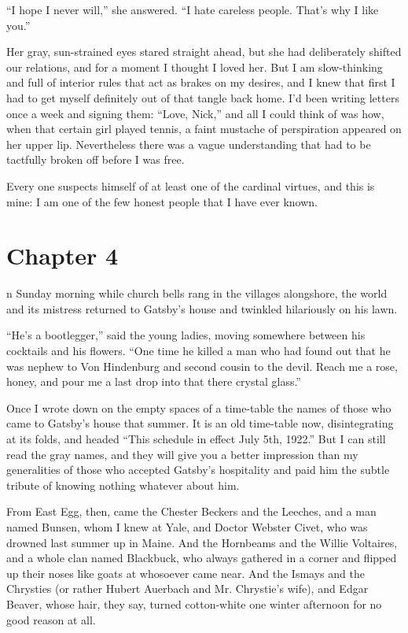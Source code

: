 \documentclass{znotebook}
\begin{document}
``I hope I never will,'' she answered. ``I hate careless people. That's why I like you.''

Her gray, sun-strained eyes stared straight ahead, but she had deliberately shifted our relations, and for a moment I thought I loved her. But I am slow-thinking and full of interior rules that act as brakes on my desires, and I knew that first I had to get myself definitely out of that tangle back home. I'd been writing letters once a week and signing them: ``Love, Nick,'' and all I could think of was how, when that certain girl played tennis, a faint mustache of perspiration appeared on her upper lip. Nevertheless there was a vague understanding that had to be tactfully broken off before I was free.

Every one suspects himself of at least one of the cardinal virtues, and this is mine: I am one of the few honest people that I have ever known.

\chapter{Chapter 4}

\lettrine[findent=2pt]{}{ }n Sunday morning while church bells rang in the villages alongshore, the world and its mistress returned to Gatsby's house and twinkled hilariously on his lawn.

``He's a bootlegger,'' said the young ladies, moving somewhere between his cocktails and his flowers. ``One time he killed a man who had found out that he was nephew to Von Hindenburg and second cousin to the devil. Reach me a rose, honey, and pour me a last drop into that there crystal glass.''

Once I wrote down on the empty spaces of a time-table the names of those who came to Gatsby's house that summer. It is an old time-table now, disintegrating at its folds, and headed ``This schedule in effect July 5th, 1922.'' But I can still read the gray names, and they will give you a better impression than my generalities of those who accepted Gatsby's hospitality and paid him the subtle tribute of knowing nothing whatever about him.

From East Egg, then, came the Chester Beckers and the Leeches, and a man named Bunsen, whom I knew at Yale, and Doctor Webster Civet, who was drowned last summer up in Maine. And the Hornbeams and the Willie Voltaires, and a whole clan named Blackbuck, who always gathered in a corner and flipped up their noses like goats at whosoever came near. And the Ismays and the Chrysties (or rather Hubert Auerbach and Mr. Chrystie's wife), and Edgar Beaver, whose hair, they say, turned cotton-white one winter afternoon for no good reason at all.
\end{document}
